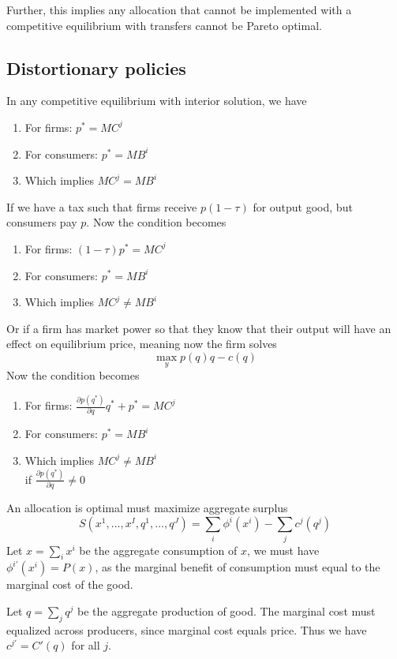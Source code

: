 \documentclass[twocolumn, fleqn]{article}
\begin{document}
		Further, this implies any allocation that cannot be implemented with a competitive equilibrium with transfers cannot be Pareto optimal.
		
		\subsection{Distortionary policies}
		In any competitive equilibrium with interior solution, we have 
		\begin{enumerate}
    	\item For firms: \( p^* = MC^j \)
   		\item For consumers: \( p^* = MB^i \)
    	\item Which implies \( MC^j = MB^i \)
		\end{enumerate}
		
		If we have a tax such that firms receive $p(1-\tau)$ for output good, but consumers pay $p$. Now the condition becomes 
		\begin{enumerate}
    	\item For firms: \( (1-\tau)p^* = MC^j \)
   		\item For consumers: \( p^* = MB^i \)
    	\item Which implies \( MC^j \neq MB^i \)
		\end{enumerate}
		
		Or if a firm has market power so that they know that their output will have an effect on equilibrium price, meaning now the firm solves 
		\[ \max_y p(q)q -c(q)\]
		Now the condition becomes
		\begin{enumerate}
    	\item For firms: \(\frac{\partial p(q^*)}{\partial q} q^* + p^* = MC^j\)
    	\item For consumers: \( p^* = MB^i \)
    	\item Which implies \( MC^j \neq MB^i \)\\[4pt]
    	if \(\frac{\partial p(q^*)}{\partial q} \neq 0\)
		\end{enumerate}
		
		An allocation is optimal must maximize aggregate surplus 
		\[S(x^1, \dots, x^I, q^1, \dots, q^J) = \sum_i \phi^i(x^i) - \sum_j c^j(q^j)\]
		Let $x=\sum_i x^i$ be the aggregate consumption of $x$, we must have $\phi^{i \prime}(x^i) = P(x)$, as the marginal benefit of consumption must equal to the marginal cost of the good. 
		
		Let $q=\sum_j q^j$ be the aggregate production of good. The marginal cost must equalized across producers, since marginal cost equals price. Thus we have \(c^{j\prime} = C'(q)\) for all $j$.
		
\end{document}
